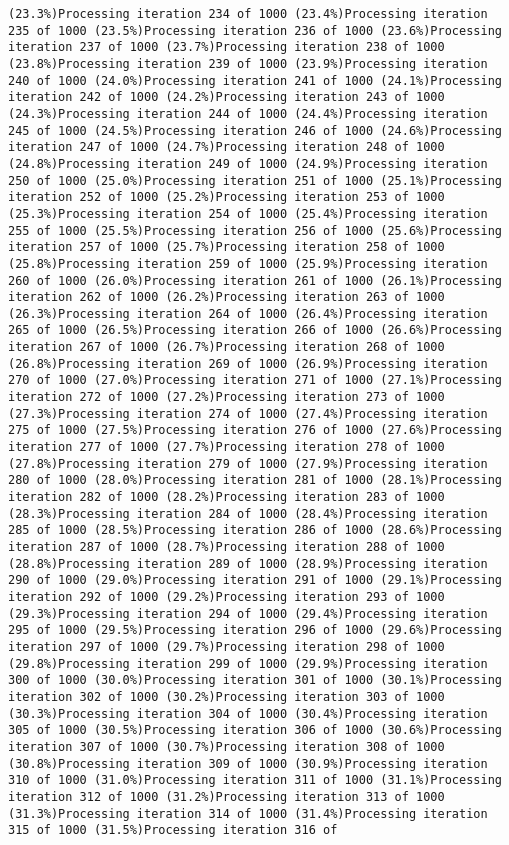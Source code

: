 \documentclass[
]{article}
\begin{document}
\begin{verbatim}
(23.3%)Processing iteration 234 of 1000 (23.4%)Processing iteration 235 of 1000 (23.5%)Processing iteration 236 of 1000 (23.6%)Processing iteration 237 of 1000 (23.7%)Processing iteration 238 of 1000 (23.8%)Processing iteration 239 of 1000 (23.9%)Processing iteration 240 of 1000 (24.0%)Processing iteration 241 of 1000 (24.1%)Processing iteration 242 of 1000 (24.2%)Processing iteration 243 of 1000 (24.3%)Processing iteration 244 of 1000 (24.4%)Processing iteration 245 of 1000 (24.5%)Processing iteration 246 of 1000 (24.6%)Processing iteration 247 of 1000 (24.7%)Processing iteration 248 of 1000 (24.8%)Processing iteration 249 of 1000 (24.9%)Processing iteration 250 of 1000 (25.0%)Processing iteration 251 of 1000 (25.1%)Processing iteration 252 of 1000 (25.2%)Processing iteration 253 of 1000 (25.3%)Processing iteration 254 of 1000 (25.4%)Processing iteration 255 of 1000 (25.5%)Processing iteration 256 of 1000 (25.6%)Processing iteration 257 of 1000 (25.7%)Processing iteration 258 of 1000 (25.8%)Processing iteration 259 of 1000 (25.9%)Processing iteration 260 of 1000 (26.0%)Processing iteration 261 of 1000 (26.1%)Processing iteration 262 of 1000 (26.2%)Processing iteration 263 of 1000 (26.3%)Processing iteration 264 of 1000 (26.4%)Processing iteration 265 of 1000 (26.5%)Processing iteration 266 of 1000 (26.6%)Processing iteration 267 of 1000 (26.7%)Processing iteration 268 of 1000 (26.8%)Processing iteration 269 of 1000 (26.9%)Processing iteration 270 of 1000 (27.0%)Processing iteration 271 of 1000 (27.1%)Processing iteration 272 of 1000 (27.2%)Processing iteration 273 of 1000 (27.3%)Processing iteration 274 of 1000 (27.4%)Processing iteration 275 of 1000 (27.5%)Processing iteration 276 of 1000 (27.6%)Processing iteration 277 of 1000 (27.7%)Processing iteration 278 of 1000 (27.8%)Processing iteration 279 of 1000 (27.9%)Processing iteration 280 of 1000 (28.0%)Processing iteration 281 of 1000 (28.1%)Processing iteration 282 of 1000 (28.2%)Processing iteration 283 of 1000 (28.3%)Processing iteration 284 of 1000 (28.4%)Processing iteration 285 of 1000 (28.5%)Processing iteration 286 of 1000 (28.6%)Processing iteration 287 of 1000 (28.7%)Processing iteration 288 of 1000 (28.8%)Processing iteration 289 of 1000 (28.9%)Processing iteration 290 of 1000 (29.0%)Processing iteration 291 of 1000 (29.1%)Processing iteration 292 of 1000 (29.2%)Processing iteration 293 of 1000 (29.3%)Processing iteration 294 of 1000 (29.4%)Processing iteration 295 of 1000 (29.5%)Processing iteration 296 of 1000 (29.6%)Processing iteration 297 of 1000 (29.7%)Processing iteration 298 of 1000 (29.8%)Processing iteration 299 of 1000 (29.9%)Processing iteration 300 of 1000 (30.0%)Processing iteration 301 of 1000 (30.1%)Processing iteration 302 of 1000 (30.2%)Processing iteration 303 of 1000 (30.3%)Processing iteration 304 of 1000 (30.4%)Processing iteration 305 of 1000 (30.5%)Processing iteration 306 of 1000 (30.6%)Processing iteration 307 of 1000 (30.7%)Processing iteration 308 of 1000 (30.8%)Processing iteration 309 of 1000 (30.9%)Processing iteration 310 of 1000 (31.0%)Processing iteration 311 of 1000 (31.1%)Processing iteration 312 of 1000 (31.2%)Processing iteration 313 of 1000 (31.3%)Processing iteration 314 of 1000 (31.4%)Processing iteration 315 of 1000 (31.5%)Processing iteration 316 of 
\end{verbatim}
\end{document}
